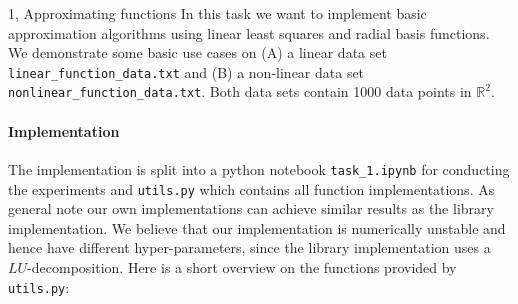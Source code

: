 \begin{task}{1, Approximating functions}
In this task we want to implement basic approximation algorithms using linear least squares and radial basis functions. We demonstrate some basic use cases on (A) a linear data set \verb|linear_function_data.txt| and (B) a non-linear data set \verb|nonlinear_function_data.txt|. Both data sets contain 1000 data points in $\mathbb{R}^2$.

\paragraph{Implementation}
The implementation is split into a python notebook \verb|task_1.ipynb| for conducting the experiments and \verb|utils.py| which contains all function implementations. As general note our own implementations can achieve similar results as the library implementation. We believe that our implementation is numerically unstable and hence have different hyper-parameters, since the library implementation uses a $LU$-decomposition. Here is a short overview on the functions provided by \verb|utils.py|:


\end{task}

